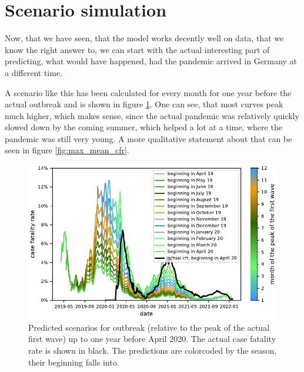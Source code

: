 \documentclass{article}
\begin{document}

\section{Scenario simulation}

Now, that we have seen, that the model works decently well on data, that we know the right answer to, we can start with the actual interesting part of predicting, what would have happened, had the pandemic arrived in Germany at a different time. 

A scenario like this has been calculated for every month for one year before the actual outbreak and is shown in figure \ref{fig:cfr_timeseries}. One can see, that most curves peak much higher, which makes sense, since the actual pandemic was relatively quickly slowed down by the coming summer, which helped a lot at a time, where the pandemic was still very young. A more qualitative statement about that can be seen in figure \ref{fig:max_mean_cfr}. 

\begin{figure}[hbt!]
  \begin{center}
    \includegraphics{../fig/CfrTimeseries.pdf}
    \caption{Predicted scenarios for outbreak (relative to the peak of the actual first wave) up to one year before April 2020. The actual case fatality rate is shown in black. The predictions are colorcoded by the season, their beginning falls into.}
    \label{fig:cfr_timeseries}
  \end{center}
\end{figure}
\end{document}
